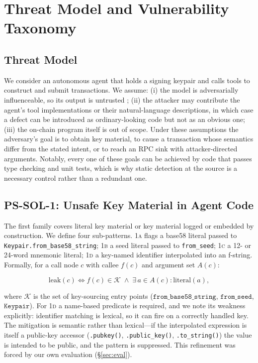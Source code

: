 \section{Threat Model and Vulnerability Taxonomy}
\label{sec:taxonomy}

\subsection{Threat Model}

We consider an autonomous agent that holds a signing keypair and calls
tools to construct and submit transactions. We assume: (i) the model is
adversarially influenceable, so its output is untrusted
\cite{zou2023universal,greshake2023notwhat}; (ii) the attacker may contribute
the agent's tool implementations or their natural-language descriptions, in
which case a defect can be introduced as ordinary-looking code but not as an
obvious one; (iii) the on-chain program itself is out of scope. Under these
assumptions the adversary's goal is to obtain key material, to cause a
transaction whose semantics differ from the stated intent, or to reach an RPC
sink with attacker-directed arguments. Notably, every one of these goals can be
achieved by code that passes type checking and unit tests, which is why static
detection at the source is a necessary control rather than a redundant one.

\subsection{PS-SOL-1: Unsafe Key Material in Agent Code}

The first family covers literal key material or key material logged or
embedded by construction. We define four sub-patterns. \textsc{1a} flags a
base58 literal passed to \texttt{Keypair.from\_base58\_string}; \textsc{1b} a
seed literal passed to \texttt{from\_seed}; \textsc{1c} a 12- or 24-word
mnemonic literal; \textsc{1d} a key-named identifier interpolated into an
f-string. Formally, for a call node $c$ with callee $f(c)$ and argument set
$A(c)$:

\begin{equation}
\mathrm{leak}(c) \iff f(c) \in \mathcal{K} \;\wedge\;
\exists\, a \in A(c): \mathrm{literal}(a),
\end{equation}

where $\mathcal{K}$ is the set of key-sourcing entry points
($\texttt{from\_base58\_string}$, $\texttt{from\_seed}$, $\texttt{Keypair}$).
For \textsc{1d} a name-based predicate is required, and we note its weakness
explicitly: identifier matching is lexical, so it can fire on a correctly
handled key. The mitigation is semantic rather than lexical---if the
interpolated expression is itself a public-key accessor
(\texttt{.pubkey()}, \texttt{.public\_key()}, \texttt{.to\_string()}) the
value is intended to be public, and the pattern is suppressed. This
refinement was forced by our own evaluation (\S\ref{sec:eval}).

